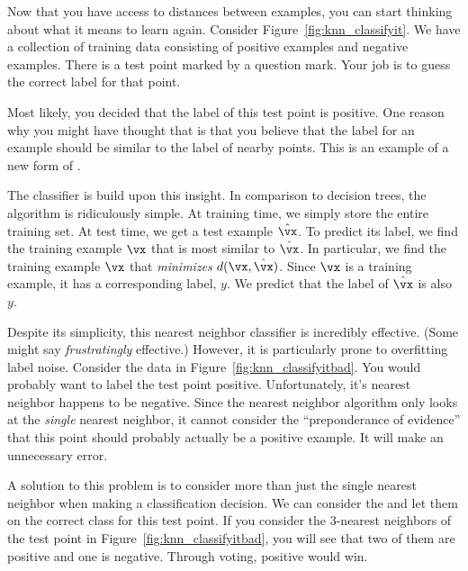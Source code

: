 Now that you have access to distances between examples, you can start
thinking about what it means to learn again.  Consider
Figure~\ref{fig:knn_classifyit}.  We have a collection of training
data consisting of positive examples and negative examples.  There is
a test point marked by a question mark.  Your job is to guess the
correct label for that point.

Most likely, you decided that the label of this test point is
positive.  One reason why you might have thought that is that you
believe that the label for an example should be similar to the label
of nearby points.  This is an example of a new form of
.

The  classifier is build upon this insight.
In comparison to decision trees, the algorithm is ridiculously
simple.  At training time, we simply store the entire training set.
At test time, we get a test example $\hat\vx$.  To predict its label,
we find the training example $\vx$ that is most similar to $\hat\vx$.
In particular, we find the training example $\vx$ that
\emph{minimizes} $d(\vx,\hat\vx)$.  Since $\vx$ is a training example,
it has a corresponding label, $y$.  We predict that the label of
$\hat\vx$ is also $y$.

Despite its simplicity, this nearest neighbor classifier is incredibly
effective.  (Some might say \emph{frustratingly} effective.)  However,
it is particularly prone to overfitting label noise.  Consider the
data in Figure~\ref{fig:knn_classifyitbad}.  You would probably want
to label the test point positive.  Unfortunately, it's nearest
neighbor happens to be negative.  Since the nearest neighbor algorithm
only looks at the \emph{single} nearest neighbor, it cannot consider
the ``preponderance of evidence'' that this point should probably
actually be a positive example.  It will make an unnecessary error.



A solution to this problem is to consider more than just the single
nearest neighbor when making a classification decision.  We can
consider the  and
let them  on the correct class for this test point.  If
you consider the $3$-nearest neighbors of the test point in
Figure~\ref{fig:knn_classifyitbad}, you will see that two of them are
positive and one is negative.  Through voting, positive would win.

